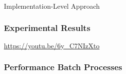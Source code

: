 \begin{frame}{Implementation-Level Approach}
    \begin{figure}
        \centerline{}
    \end{figure}
\end{frame}


\begin{frame}
    \frametitle{Experimental Results}
    \centering
    \LARGE
    \textcolor{blue}{\url{https://youtu.be/6y\_C7NIzXto}}
\end{frame}

\begin{frame}
    \frametitle{Performance Batch Processes}
    \begin{figure}[h]
        \centering
        \resizebox{0.9\textwidth}{!}{}
    \end{figure}
\end{frame}
